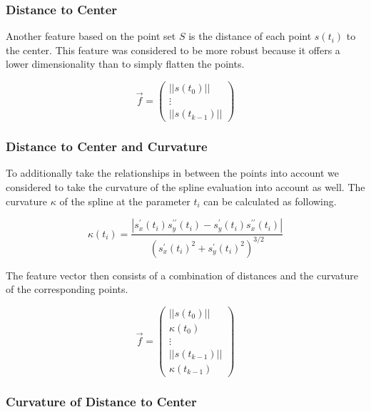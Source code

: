 \documentclass[pdftex,12pt,a4paper]{report}
\begin{document}
\subsubsection{Distance to Center}

Another feature based on the point set $S$ is the distance of each point $s(t_i)$ to the
center. This feature was considered	to be more robust because it offers a lower dimensionality
than to simply flatten the points.

\begin{equation}
\vec{f} = \left( \begin{array}{c}
||s(t_0)|| \\
\vdots \\
||s(t_{k-1})||
\end{array} \right)
\end{equation}

\subsubsection{Distance to Center and Curvature}
\label{subsub:featuredistancetocenterandcurvature}

To additionally take the relationships in between the points into account we considered
to take the curvature of the spline evaluation into account as well. The curvature $\kappa$ of the spline at the parameter $t_i$ can be calculated as following.

\begin{equation}
\kappa(t_i) = \frac{|s_x^\prime(t_i) s_y^{\prime\prime}(t_i) - s_y^\prime(t_i) s_x^{\prime\prime}(t_i)|}{(s_x^\prime(t_i)^2 + s_y^{\prime}(t_i)^2)^{3/2}}
\end{equation}

The feature vector then consists of a combination of distances and the curvature of the
corresponding points.

\begin{equation}
\vec{f} = \left( \begin{array}{c}
||s(t_0)|| \\
\kappa(t_0) \\
\vdots \\
||s(t_{k-1})|| \\
\kappa(t_{k-1})
\end{array} \right)
\end{equation}

\subsubsection{Curvature of Distance to Center}
\end{document}
